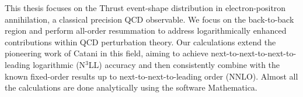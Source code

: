 \documentclass[10pt,english]{article}
\begin{document}
\frontispiece

\beforepreface %

This thesis focuses on the Thrust event-shape distribution in electron-positron 
annihilation, a classical precision QCD observable. We focus on the back-to-back region
and perform all-order resummation to address logarithmically enhanced contributions 
within QCD perturbation theory. Our calculations extend the pioneering work of Catani in this field,
aiming to achieve next-to-next-to-next-to-leading logarithmic (N$^3$LL) accuracy 
and then consistently combine with the known fixed-order results up to next-to-next-to-leading order 
(NNLO). Almost all the calculations are done analytically using the software Mathematica.


\tableofcontents
{}
\setcounter{page}{1}

 









\appendix


\printbibliography
\end{document}
